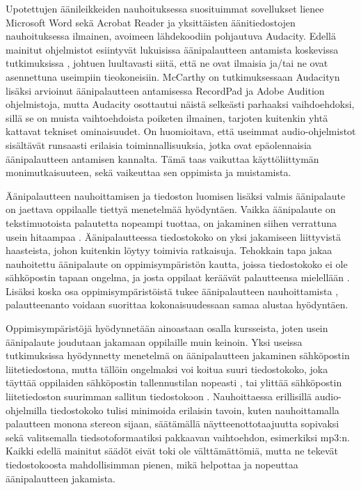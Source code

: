 \documentclass[utf8]{gradu3}
\begin{document}
Upotettujen äänileikkeiden nauhoituksessa suosituimmat sovellukset lienee Microsoft Word sekä Acrobat Reader ja yksittäisten äänitiedostojen nauhoituksessa ilmainen, avoimeen lähdekoodiin pohjautuva Audacity. Edellä mainitut ohjelmistot esiintyvät lukuisissa äänipalautteen antamista koskevissa tutkimuksissa \parencite[][]{using, ice, principles, evaluating, areYouListening, engaging, academics, attitudes, versus}, johtuen luultavasti siitä, että ne ovat ilmaisia ja/tai ne ovat asennettuna useimpiin tieokoneisiin. McCarthy \parencite[][]{evaluating} on tutkimuksessaan Audacityn lisäksi arvioinut äänipalautteen antamisessa RecordPad ja Adobe Audition ohjelmistoja, mutta Audacity osottautui näistä selkeästi parhaaksi vaihdoehdoksi, sillä se on muista vaihtoehdoista poiketen ilmainen, tarjoten kuitenkin yhtä kattavat tekniset ominaisuudet. On huomioitava, että useimmat audio-ohjelmistot sisältävät runsaasti erilaisia toiminnallisuuksia, jotka ovat epäolennaisia äänipalautteen antamisen kannalta. Tämä taas vaikuttaa käyttöliittymän monimutkaisuuteen, sekä vaikeuttaa sen oppimista ja muistamista.

Äänipalautteen nauhoittamisen ja tiedoston luomisen lisäksi valmis äänipalaute on jaettava oppilaalle tiettyä menetelmää hyödyntäen. Vaikka äänipalaute on tekstimuotoista palautetta nopeampi tuottaa, on jakaminen siihen verrattuna usein hitaampaa \parencite[][]{evaluating}. Äänipalautteessa tiedostokoko on yksi jakamiseen liittyvistä haasteista, johon kuitenkin löytyy toimivia ratkaisuja. Tehokkain tapa jakaa nauhoitettu äänipalaute on oppimisympäristön kautta, joissa tiedostokoko ei ole sähköpostin tapaan ongelma, ja josta oppilaat keräävät palautteensa mielellään \parencite[][]{areYouListening}. Lisäksi koska osa oppimisympäristöistä tukee äänipalautteen nauhoittamista \parencite[][]{using}, palautteenanto  voidaan suorittaa kokonaisuudessaan samaa alustaa hyödyntäen. 

Oppimisympäristöjä hyödynnetään ainoastaan osalla kursseista, joten usein äänipalaute joudutaan jakamaan oppilaille muin keinoin. Yksi useissa tutkimuksissa hyödynnetty menetelmä on äänipalautteen jakaminen sähköpostin liitetiedostona, mutta tällöin ongelmaksi voi koitua suuri tiedostokoko, joka täyttää oppilaiden sähköpostin tallennustilan nopeasti \parencite[][]{developing}, tai ylittää sähköpostin liitetiedoston suurimman sallitun tiedostokoon \parencite[][]{versus}. Nauhoittaessa erillisillä audio-ohjelmilla tiedostokoko tulisi minimoida erilaisin tavoin, kuten nauhoittamalla palautteen monona stereon sijaan, säätämällä näytteenottotaajuutta sopivaksi \parencite[][]{voice} sekä valitsemalla tiedsotoformaatiksi pakkaavan vaihtoehdon, esimerkiksi mp3:n. Kaikki edellä mainitut säädöt eivät toki ole välttämättömiä, mutta ne tekevät tiedostokoosta mahdollisimman pienen, mikä helpottaa ja nopeuttaa äänipalautteen jakamista. 
\end{document}
